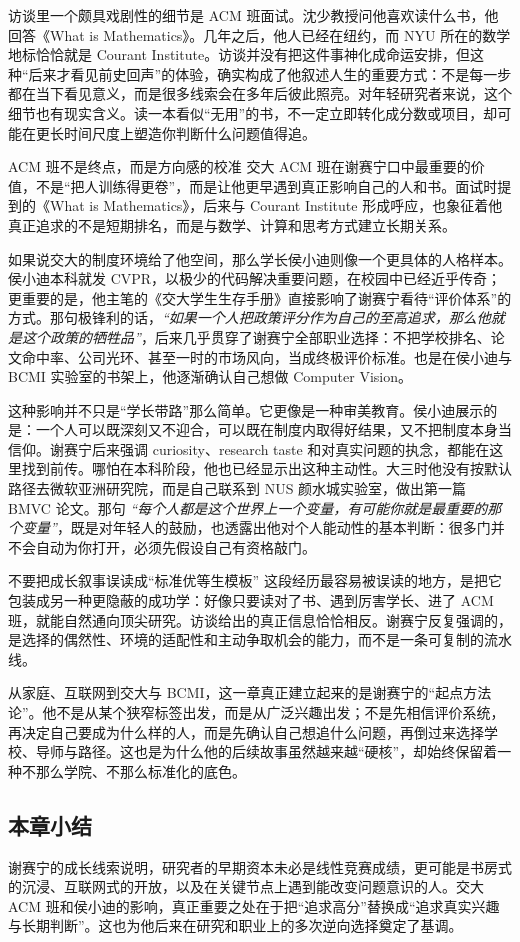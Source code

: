 访谈里一个颇具戏剧性的细节是 ACM 班面试。沈少教授问他喜欢读什么书，他回答《What is Mathematics》。几年之后，他人已经在纽约，而 NYU 所在的数学地标恰恰就是 Courant Institute。访谈并没有把这件事神化成命运安排，但这种“后来才看见前史回声”的体验，确实构成了他叙述人生的重要方式：不是每一步都在当下看见意义，而是很多线索会在多年后彼此照亮。对年轻研究者来说，这个细节也有现实含义。读一本看似“无用”的书，不一定立即转化成分数或项目，却可能在更长时间尺度上塑造你判断什么问题值得追。

\begin{importantbox}{ACM 班不是终点，而是方向感的校准}
交大 ACM 班在谢赛宁口中最重要的价值，不是“把人训练得更卷”，而是让他更早遇到真正影响自己的人和书。面试时提到的《What is Mathematics》，后来与 Courant Institute 形成呼应，也象征着他真正追求的不是短期排名，而是与数学、计算和思考方式建立长期关系。
\end{importantbox}

如果说交大的制度环境给了他空间，那么学长侯小迪则像一个更具体的人格样本。侯小迪本科就发 CVPR，以极少的代码解决重要问题，在校园中已经近乎传奇；更重要的是，他主笔的《交大学生生存手册》直接影响了谢赛宁看待“评价体系”的方式。那句极锋利的话，\textit{``如果一个人把政策评分作为自己的至高追求，那么他就是这个政策的牺牲品''}，后来几乎贯穿了谢赛宁全部职业选择：不把学校排名、论文命中率、公司光环、甚至一时的市场风向，当成终极评价标准。也是在侯小迪与 BCMI 实验室的书架上，他逐渐确认自己想做 Computer Vision。

这种影响并不只是“学长带路”那么简单。它更像是一种审美教育。侯小迪展示的是：一个人可以既深刻又不迎合，可以既在制度内取得好结果，又不把制度本身当信仰。谢赛宁后来强调 curiosity、research taste 和对真实问题的执念，都能在这里找到前传。哪怕在本科阶段，他也已经显示出这种主动性。大三时他没有按默认路径去微软亚洲研究院，而是自己联系到 NUS 颜水城实验室，做出第一篇 BMVC 论文。那句 \textit{``每个人都是这个世界上一个变量，有可能你就是最重要的那个变量''}，既是对年轻人的鼓励，也透露出他对个人能动性的基本判断：很多门并不会自动为你打开，必须先假设自己有资格敲门。

\begin{warningbox}{不要把成长叙事误读成“标准优等生模板”}
这段经历最容易被误读的地方，是把它包装成另一种更隐蔽的成功学：好像只要读对了书、遇到厉害学长、进了 ACM 班，就能自然通向顶尖研究。访谈给出的真正信息恰恰相反。谢赛宁反复强调的，是选择的偶然性、环境的适配性和主动争取机会的能力，而不是一条可复制的流水线。
\end{warningbox}

从家庭、互联网到交大与 BCMI，这一章真正建立起来的是谢赛宁的“起点方法论”。他不是从某个狭窄标签出发，而是从广泛兴趣出发；不是先相信评价系统，再决定自己要成为什么样的人，而是先确认自己想追什么问题，再倒过来选择学校、导师与路径。这也是为什么他的后续故事虽然越来越“硬核”，却始终保留着一种不那么学院、不那么标准化的底色。

\subsection{本章小结}

谢赛宁的成长线索说明，研究者的早期资本未必是线性竞赛成绩，更可能是书房式的沉浸、互联网式的开放，以及在关键节点上遇到能改变问题意识的人。交大 ACM 班和侯小迪的影响，真正重要之处在于把“追求高分”替换成“追求真实兴趣与长期判断”。这也为他后来在研究和职业上的多次逆向选择奠定了基调。

